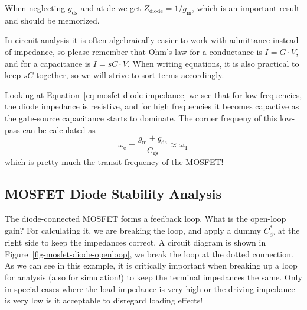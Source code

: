 \documentclass[
  a4paper,
  DIV=11,
  numbers=noendperiod]{scrartcl}
\begin{document}
When neglecting \(g_\mathrm{ds}\) and at dc we get
\(Z_\mathrm{diode} = 1 / g_\mathrm{m}\), which is an important result
and should be memorized.

\begin{tcolorbox}[enhanced jigsaw, breakable, title=\textcolor{quarto-callout-important-color}{\faExclamation}\hspace{0.5em}{The Admittance is Your Friend}, left=2mm, bottomrule=.15mm, opacitybacktitle=0.6, opacityback=0, colframe=quarto-callout-important-color-frame, leftrule=.75mm, bottomtitle=1mm, colbacktitle=quarto-callout-important-color!10!white, toprule=.15mm, rightrule=.15mm, toptitle=1mm, titlerule=0mm, arc=.35mm, colback=white, coltitle=black]

In circuit analysis it is often algebraically easier to work with
admittance instead of impedance, so please remember that Ohm's law for a
conductance is \(I = G \cdot V\), and for a capacitance is
\(I = s C \cdot V\). When writing equations, it is also practical to
keep \(s C\) together, so we will strive to sort terms accordingly.

\end{tcolorbox}

Looking at Equation~\ref{eq-mosfet-diode-impedance} we see that for low
frequencies, the diode impedance is resistive, and for high frequencies
it becomes capactive as the gate-source capacitance starts to dominate.
The corner frequeny of this low-pass can be calculated as \[
\omega_\mathrm{c} = \frac{g_\mathrm{m}+ g_\mathrm{ds}}{C_\mathrm{gs}} \approx \omega_\mathrm{T}
\] which is pretty much the transit frequency of the MOSFET!

\subsection{MOSFET Diode Stability
Analysis}\label{mosfet-diode-stability-analysis}

The diode-connected MOSFET forms a feedback loop. What is the open-loop
gain? For calculating it, we are breaking the loop, and apply a dummy
\(C_\mathrm{gs}^{*}\) at the right side to keep the impedances correct.
A circuit diagram is shown in Figure~\ref{fig-mosfet-diode-openloop}, we
break the loop at the dotted connection. As we can see in this example,
it is critically important when breaking up a loop for analysis (also
for simulation!) to keep the terminal impedances the same. Only in
special cases where the load impedance is very high or the driving
impedance is very low is it acceptable to disregard loading effects!
\end{document}
